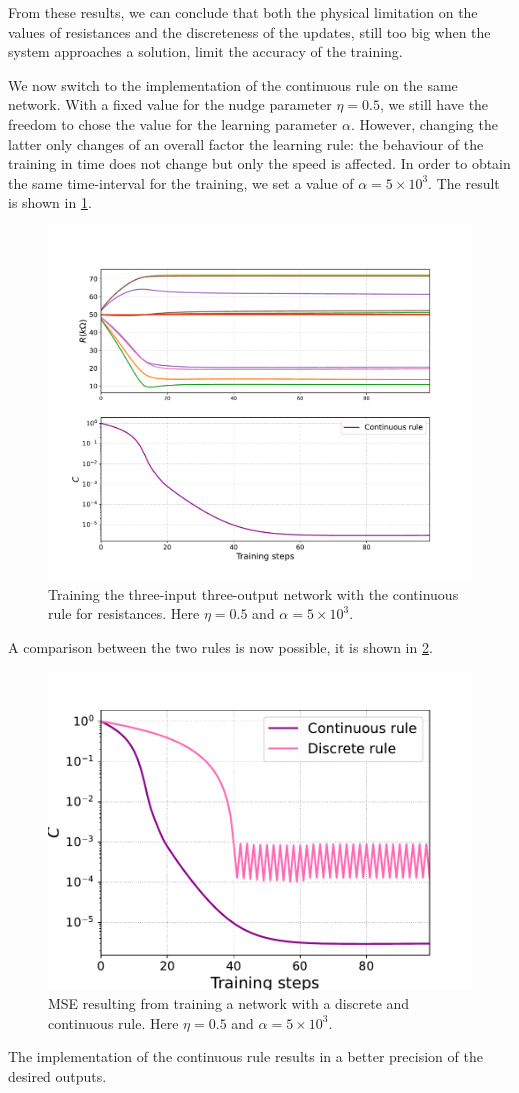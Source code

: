 \documentclass[10.5pt]{article}
\begin{document}
From these results, we can conclude that both the physical limitation on the values of resistances and the discreteness of the updates, still too big when the system approaches a solution, limit the accuracy of the training.

We now switch to the implementation of the continuous rule on the same network. With a fixed value for the nudge parameter $\eta=0.5$, we still have the freedom to chose the value for the learning parameter $\alpha$. However, changing the latter only changes of an overall factor the learning rule: the behaviour of the training in time does not change but only the speed is affected. In order to obtain the same time-interval for the training, we set a value of $\alpha = 5 \times 10^3$. The result is shown in \cref{fig:general_training_continuous}.
\begin{figure}[t]
    \centering
    \includegraphics[width=0.5\columnwidth]{../figures_tex/general_training_continuous.pdf}
    \caption{Training the three-input three-output network with the continuous rule for resistances. Here $\eta = 0.5$ and $\alpha = 5 \times 10^3$.}
    \label{fig:general_training_continuous}
\end{figure}

A comparison between the two rules is now possible, it is shown in \cref{fig:general_training_comparison}.
\begin{figure}[t]
    \centering
    \includegraphics[width=0.5\columnwidth]{../figures_tex/comparison_general.pdf}
    \caption{MSE resulting from training a network with a discrete and continuous rule. Here $\eta = 0.5$ and $\alpha = 5 \times 10^3$.}
    \label{fig:general_training_comparison}
\end{figure}
The implementation of the continuous rule results in a better precision of the desired outputs. 
\end{document}
